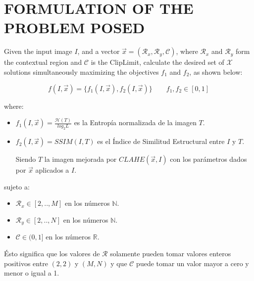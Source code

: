 \documentclass[spanish,twocolumn]{article}
\begin{document}
\section{FORMULATION OF THE PROBLEM POSED}
\label{sec:formulacion}

Given the input image $I$, and a vector $\overrightarrow{x}=(\mathcal{R}_x, \mathcal{R}_y, \mathcal{C})$, where $\mathcal{R}_x$ and $\mathcal{R}_y$ form the contextual region and $\mathscr{C}$ is the ClipLimit, calculate the desired set of $\mathscr{X}$ solutions simultaneously maximizing the objectives $f_1$ and $f_2$, as shown below:

\begin{equation}\label{eq:fitness}
    f(I, \overrightarrow{x}) = \{ f_1(I, \overrightarrow{x}), f_2(I, \overrightarrow{x}) \} \qquad f_1,f_2 \in [0,1]
\end{equation}

where:
\begin{itemize}
\item $f_{1}(I, \overrightarrow{x})=\frac{\mathscr{H}(T)}{log_{2}L}$ es la Entropía normalizada de la imagen $T$.%
\item $f_{2}(I, \overrightarrow{x})=SSIM(I,T)$ es el Índice de Similitud Estructural entre $I$ y $T$.

Siendo $T$ la imagen mejorada por $CLAHE(\overrightarrow{x},I)$ con los parámetros dados por $\overrightarrow{x}$ aplicados a $I$.

\end{itemize}

sujeto a:

\begin{itemize}
\item $\mathcal{R}_x \in [2,..,M]$ en los números $\mathbb{N}$.
\item $\mathcal{R}_y \in [2,..,N]$ en los números $\mathbb{N}$.
\item $\mathscr{C} \in (0,1]$ en los números $\mathbb{R}$.
\end{itemize}

Ésto significa que los valores de $\mathcal{R}$ solamente pueden tomar valores enteros positivos entre $(2,2)$ y $(M,N)$ y que $\mathscr{C}$ puede tomar un valor mayor a cero y menor o igual a 1.
\end{document}
